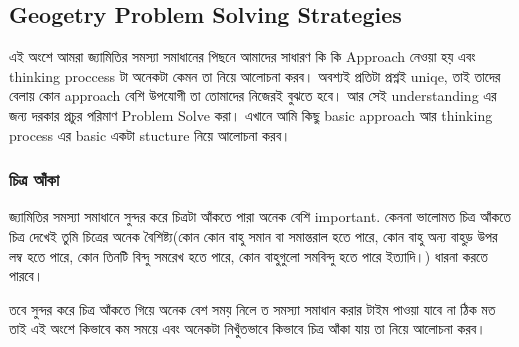 \documentclass[a4paper,11pt]{article}
\begin{document}
\subsection{Geogetry Problem Solving Strategies}
এই অংশে আমরা জ্যামিতির সমস্যা সমাধানের পিছনে আমাদের সাধারণ কি কি Approach নেওয়া হয় এবং thinking proccess টা অনেকটা কেমন তা নিয়ে আলোচনা করব। অবশ্যই প্রতিটা প্রশ্নই uniqe, তাই তাদের বেলায় কোন approach বেশি উপযোগী তা তোমাদের নিজেরই বুঝতে হবে। আর সেই understanding এর জন্য দরকার প্রচুর পরিমাণ Problem Solve করা। এখানে আমি কিছু basic approach আর thinking process এর basic একটা stucture নিয়ে আলোচনা করব। 
\subsubsection{চিত্র আঁকা}
জ্যামিতির সমস্যা সমাধানে সুন্দর করে চিত্রটা আঁকতে পারা অনেক বেশি important. কেননা ভালোমত চিত্র আঁকতে চিত্র দেখেই তুমি চিত্রের অনেক বৈশিষ্ট্য(কোন কোন বাহু সমান বা সমান্তরাল হতে পারে, কোন বাহু অন্য বাহুড় উপর লম্ব হতে পারে, কোন তিনটি বিন্দু সমরেখ হতে পারে, কোন বাহুগুলো সমবিন্দু হতে পারে ইত্যাদি।) ধারনা করতে পারবে। 

তবে সুন্দর করে চিত্র আঁকতে গিয়ে অনেক বেশ সময় নিলে ত সমস্যা সমাধান করার টাইম পাওয়া যাবে না ঠিক মত তাই এই অংশে কিভাবে কম সময়ে এবং অনেকটা নিখুঁতভাবে কিভাবে চিত্র আঁকা যায় তা নিয়ে আলোচনা করব। 
\end{document}
